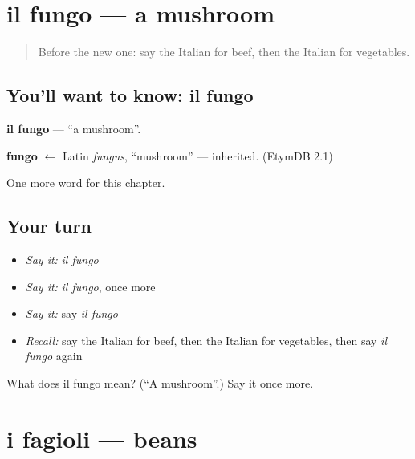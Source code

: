 \section[il fungo]{il fungo — a mushroom}

\label{lesson:IT-C106-fungo}



\begin{quote}
Before the new one: say the Italian for beef, then the Italian for vegetables.
\end{quote}

\subsection*{You'll want to know: il fungo}
\textbf{il fungo} — \textquotedblleft{}a mushroom\textquotedblright{}.

\begin{cousinweb}
\textbf{fungo} $\leftarrow$ Latin \emph{fungus}, \textquotedblleft{}mushroom\textquotedblright{} — inherited. (EtymDB 2.1)
\end{cousinweb}

\begin{grammarlens}[title={What you've built}]
One more word for this chapter.
\end{grammarlens}

\subsection*{Your turn}
\begin{itemize}
\raggedright
  \item \emph{Say it:} \emph{il fungo}
  \item \emph{Say it:} \emph{il fungo}, once more
  \item \emph{Say it:} say \emph{il fungo}
  \item \emph{Recall:} say the Italian for beef, then the Italian for vegetables, then say \emph{il fungo} again
\end{itemize}

\begin{tcolorbox}[breakable,colback=teal!4,colframe=teal!35!black,title={Before you move on}]
What does il fungo mean? (\textquotedblleft{}A mushroom\textquotedblright{}.) Say it once more.
\end{tcolorbox}
\section[i fagioli]{i fagioli — beans}

